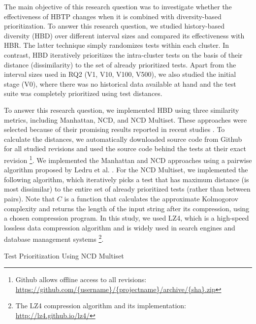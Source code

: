 \documentclass[1p]{elsarticle}
\begin{document}
The main objective of this research question was to investigate whether the effectiveness of HBTP changes when it is combined with diversity-based prioritization. To answer this research question, we studied history-based diversity (HBD) over different interval sizes and compared its effectiveness with HBR. The latter technique simply randomizes tests within each cluster. In contrast, HBD iteratively prioritizes the intra-cluster tests on the basis of their distance (dissimilarity) to the set of already prioritized tests. Apart from the interval sizes used in RQ2 (V1, V10, V100, V500), we also studied the initial stage (V0), where there was no historical data available at hand and the test suite was completely prioritized using test distances.

To answer this research question, we implemented HBD using three similarity metrics, including Manhattan, NCD, and NCD Multiset. These approaches were selected because of their promising results reported in recent studies \cite{ledru2012prioritizing,henard2016comparing,feldt2016test}. To calculate the distances, we automatically downloaded source code from Github for all studied revisions and used the source code behind the tests at their exact revision \footnote{Github allows offline access to all revisions: \url{https://github.com/{username}/{projectname}/archive/{sha}.zip}}. We implemented the Manhattan and NCD approaches using a pairwise algorithm proposed by Ledru et al. \cite{ledru2012prioritizing}. For the NCD Multiset, we implemented the following algorithm, which iteratively picks a test that has maximum distance (is most dissimilar) to the entire set of already prioritized tests (rather than between pairs). Note that $C$ is a function that calculates the approximate Kolmogorov complexity and returns the length of the input string after its compression, using a chosen compression program. In this study, we used LZ4, which is a high-speed lossless data compression algorithm and is widely used in search engines and database management systems \footnote{The LZ4 compression algorithm and its implementation: \url{http://lz4.github.io/lz4/}}.\\

\begin{algorithm}[H]
\SetAlgoLined
{}
 \caption{Test Prioritization Using NCD Multiset}
\end{algorithm}
\end{document}
